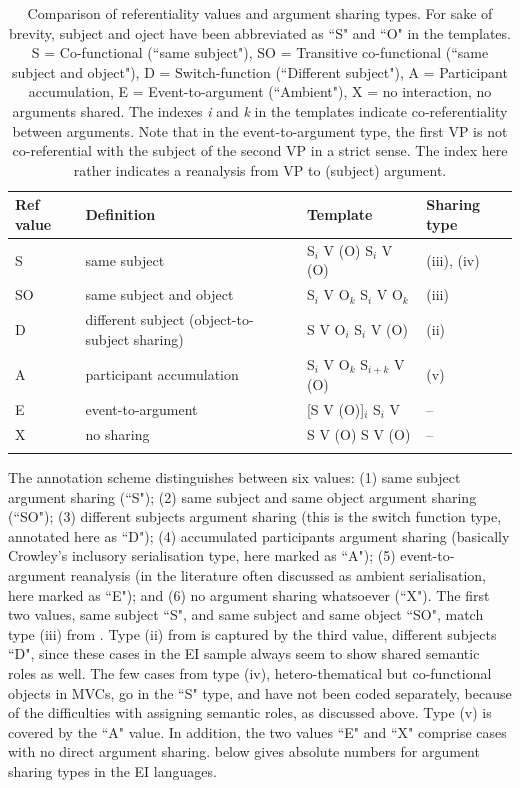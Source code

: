 \begin{table}
\begin{tabular}{l p{4cm} l l}
\lsptoprule
Ref value & Definition & Template & Sharing type \\ 
\midrule 
S & same subject & S$_i$ V (O) S$_i$ V (O) &  (iii), (iv) \\ 
\tablevspace
SO & same subject and object & S$_i$ V O$_k$ S$_i$ V O$_k$ & (iii) \\ 
\tablevspace
D & different subject (object-to-subject sharing) & S V O$_i$ S$_i$ V (O) & (ii) \\ 
\tablevspace
A & participant accumulation & S$_i$ V O$_k$ S$_{i+k}$ V (O) & (v) \\  
\tablevspace
E & event-to-argument & [S V (O)]$_i$ S$_i$ V & -- \\ 
\tablevspace
X & no sharing & S V (O) S V (O) & -- \\ 
\lspbottomrule 
\end{tabular} 
\caption[Comparison of referentiality and argument sharing types]{Comparison of referentiality values and argument sharing types. For sake of brevity, subject and oject have been abbreviated as ``S" and ``O" in the templates. S = Co-functional (``same subject"), SO = Transitive co-functional (``same subject and object"), D = Switch-function (``Different subject"), A = Participant accumulation, E = Event-to-argument (``Ambient"), X = no interaction, no arguments shared. The indexes \textit{i} and \textit{k} in the templates indicate co-referentiality between arguments. Note that in the event-to-argument type, the first VP is not co-referential with the subject of the second VP in a strict sense. The index here rather indicates a reanalysis from VP to (subject) argument.}
\label{table:comparison_ref-sharing}
\end{table}

\largerpage[1]
The annotation scheme distinguishes between six values: (1) same subject argument sharing (``S"); (2) same subject and same object argument sharing (``SO"); (3) different subjects argument sharing (this is the switch function type, annotated here as ``D"); (4) accumulated participants argument sharing (basically Crowley's inclusory serialisation type, here marked as ``A"); (5) event-to-argument reanalysis (in the literature often discussed as ambient serialisation, here marked as ``E"); and (6) no argument sharing whatsoever (``X"). The first two values, same subject ``S", and same subject and same object ``SO", match type (iii) from . Type (ii) from  is captured by the third value, different subjects ``D", since these cases in the EI sample always seem to show shared semantic roles as well. The few cases from type (iv), hetero-thematical but co-functional objects in MVCs, go in the ``S" type, and have not been coded separately, because of the difficulties with assigning semantic roles, as discussed above. Type (v) is covered by the ``A" value. In addition, the two values ``E" and ``X" comprise cases with no direct argument sharing.  below gives absolute numbers  for argument sharing types in the EI languages.

